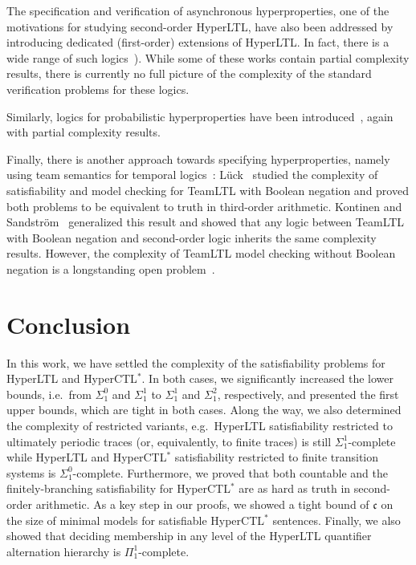\documentclass[dvipsnames,10pt,a4paper]{amsart}
\theoremstyle{definition}
\theoremstyle{remark}
\newcommand{\contcard}{\cont}
\newcommand{\cont}{\mathfrak{c}}
\newcommand{\hyltl}{{HyperLTL}\xspace}
\newcommand{\hyctlstar}{{HyperCTL$^*$}\xspace}
\newcommand{\teamltl}{{TeamLTL}\xspace}
\begin{document}
The specification and verification of asynchronous hyperproperties, one of the motivations for studying second-order \hyltl, have also been addressed by introducing dedicated (first-order) extensions of \hyltl. In fact, there is a wide range of such logics~\cite{BartocciHNC23,DBLP:conf/cav/BaumeisterCBFS21,BeutnerF23,DBLP:journals/corr/abs-2404-16778,DBLP:conf/lics/BozzelliPS21,DBLP:conf/concur/BozzelliPS22,DBLP:journals/pacmpl/GutsfeldMO21,DBLP:conf/tacas/HsuBFS23,DBLP:conf/mfcs/KontinenSV23,KontinenSV24,DBLP:conf/mfcs/KrebsMV018}).
While some of these works contain partial complexity results, there is currently no full picture of the complexity of the standard verification problems for these logics.

Similarly, logics for probabilistic hyperproperties have been introduced~\cite{DBLP:conf/qest/AbrahamB18,DBLP:conf/nfm/DobeWABB22,DBLP:conf/atva/AbrahamBBD20,DimitrovaFT20}, again with partial complexity results.

Finally, there is another approach towards specifying hyperproperties, namely using team semantics for temporal logics~\cite{DBLP:conf/mfcs/KrebsMV018,teamltlarxiv}:
Lück~\cite{Luck20} studied the complexity of satisfiability and model checking for \teamltl  with Boolean negation and proved both problems to be equivalent to truth in third-order arithmetic. Kontinen and Sandström~\cite{DBLP:conf/wollic/KontinenS21} generalized this result and showed that any logic between \teamltl with Boolean negation and second-order logic inherits the same complexity results. However, the complexity of \teamltl model checking without Boolean negation is a longstanding open problem~\cite{DBLP:conf/mfcs/KrebsMV018,teamltlarxiv}.


\section{Conclusion}
\label{sec:conc}

In this work, we have settled the complexity of the satisfiability problems for \hyltl and \hyctlstar. In both cases, we significantly increased the lower bounds, i.e.\ from $\Sigma_1^0$ and $\Sigma_1^1$ to  $\Sigma_1^1$ and $\Sigma_1^2$, respectively, and presented the first upper bounds, which are tight in both cases.
Along the way, we also determined the complexity of restricted variants, e.g.\ \hyltl satisfiability restricted to ultimately periodic traces (or, equivalently, to finite traces) is still $\Sigma_1^1$-complete while \hyltl and \hyctlstar satisfiability restricted to finite transition systems is $\Sigma_1^0$-complete.
Furthermore, we proved that both countable and the finitely-branching satisfiability for \hyctlstar are as hard as truth in second-order arithmetic.
As a key step in our proofs, we showed a tight bound of $\contcard$ on the size of minimal models for satisfiable \hyctlstar sentences.
Finally, we also showed that deciding membership in any level of the \hyltl quantifier alternation hierarchy is $\Pi_1^1$-complete. 
\end{document}
